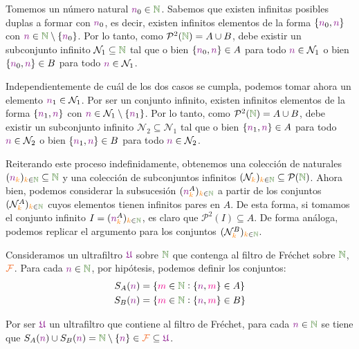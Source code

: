 \documentclass[titlepage,11pt,a4paper]{book}
\newcommand{\NN}{\ensuremath{\textcolor{OliveGreen}{\mathbb{N}}}}
\newcommand{\filt}{\ensuremath{\textcolor{Orange}{\mathcal{F}}}}
\newcommand{\ultf}{\ensuremath{\textcolor{Plum}{\mathfrak{U}}}}
\newcommand{\nn}{\ensuremath{\textcolor{Plum}{n}}}
\newcommand{\mm}{\ensuremath{\textcolor{Magenta}{m}}}
\newcommand{\kk}{\textcolor{orange}{k}}
\newcommand{\borde}[1]{%
  \begingroup
  \setlength{\fboxsep}{2.5pt}%
  \setlength{\fboxrule}{1pt}%
  \textcolor{black}{\fbox{\normalcolor\ensuremath{#1}}}%
  \hspace{4pt}%
  \vspace{0.5 pt}
  \endgroup
}
\begin{document}
    \begin{resol}
        \borde{Dem \ 1} Tomemos un número natural $\nn_{0} \in \NN$. Sabemos que existen infinitas posibles duplas a formar con $\nn_{0}$, es decir, existen infinitos elementos de la forma $\{\nn_{0}, \nn\}$ con $\nn \in \NN \setminus \{\nn_{0}\}$. Por lo tanto, como $\mathcal{P}^{2}(\NN) = A \cup B$, debe existir un subconjunto infinito $\mathcal{N}_{1} \subseteq\NN $ tal que o bien $\{\nn_{0}, \nn\} \in A$ para todo $\nn \in \mathcal{N}_{1}$ o bien $\{\nn_{0}, \nn\} \in B$ para todo $\nn \in \mathcal{N}_{1}$.

        \medskip
        Independientemente de cuál de los dos casos se cumpla, podemos tomar ahora un elemento $\nn_1 \in \mathcal{N}_{1}$. Por ser un conjunto infinito, existen infinitos elementos de la forma $\{\nn_{1}, \nn\}$ con $\nn \in \mathcal{N}_{1} \setminus \{\nn_{1}\}$. Por lo tanto, como $\mathcal{P}^{2}(\NN) = A \cup B$, debe existir un subconjunto infinito $\mathcal{N}_{2} \subseteq\mathcal{N}_{1} $ tal que o bien $\{\nn_{1}, \nn\} \in A$ para todo $\nn \in \mathcal{N}_{2}$ o bien $\{\nn_{1}, \nn\} \in B$ para todo $\nn \in \mathcal{N}_{2}$.

        \medskip
        Reiterando este proceso indefinidamente, obtenemos una colección de naturales $(\nn_{\kk})_{\kk \in \NN} \subseteq \NN$ y una colección de subconjuntos infinitos $(\mathcal{N}_{\kk})_{\kk \in \NN} \subseteq \mathcal{P}(\NN)$. 
        Ahora bien, podemos considerar la subsucesión $(\nn_{\kk}^{A})_{\kk \in \NN}$ a partir de los conjuntos $(\mathcal{N}_{\kk}^{A})_{\kk \in \NN}$  cuyos elementos tienen infinitos pares en $A$. De esta forma, si tomamos el conjunto infinito $I =(\nn_{\kk}^{A})_{\kk \in \NN} $, es claro que $\mathcal{P}^{2}(I) \subseteq A$. De forma análoga, podemos replicar el argumento para los conjuntos $(\mathcal{N}_{\kk}^{B})_{\kk \in \NN}$.

        \bigskip
        \borde{Dem \ 2} Consideramos un ultrafiltro $\ultf$ sobre $\NN$ que contenga al filtro de Fréchet sobre $\NN$, $\filt$. Para cada $\nn \in \NN$, por hipótesis, podemos definir los conjuntos:
        \[
        \begin{aligned}
            S_{A}(\nn) &= \{\mm \in \NN : \{\nn, \mm\} \in A\}\\
            S_{B}(\nn) &= \{\mm \in \NN : \{\nn, \mm\} \in B\}
        \end{aligned}
        \]

        \medskip
        Por ser $\ultf$ un ultrafiltro que contiene al filtro de Fréchet, para cada $\nn \in \NN$ se tiene que $S_{A}(\nn) \cup S_{B}(\nn) = \NN \setminus \{\nn\} \in \filt \subseteq \ultf$.
        

\end{resol}
\end{document}
